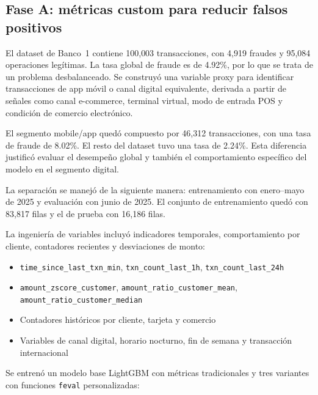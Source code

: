 \documentclass[10pt,a4paper]{article}
\begin{document}
\subsection{Fase A: métricas custom para reducir falsos positivos}

El dataset de Banco~1 contiene 100{,}003 transacciones, con 4{,}919 fraudes y 95{,}084 operaciones
legítimas. La tasa global de fraude es de 4.92\%, por lo que se trata de un problema desbalanceado.
Se construyó una variable proxy para identificar transacciones de app móvil o canal digital
equivalente, derivada a partir de señales como canal e-commerce, terminal virtual, modo de
entrada POS y condición de comercio electrónico.

El segmento mobile/app quedó compuesto por 46{,}312 transacciones, con una tasa de fraude
de 8.02\%. El resto del dataset tuvo una tasa de 2.24\%. Esta diferencia justificó evaluar
el desempeño global y también el comportamiento específico del modelo en el segmento digital.

La separación se manejó de la siguiente manera: entrenamiento con enero--mayo de 2025 y evaluación con
junio de 2025. El conjunto de entrenamiento quedó con 83{,}817 filas y el de prueba con 16{,}186 filas.

La ingeniería de variables incluyó indicadores temporales, comportamiento por cliente,
contadores recientes y desviaciones de monto:

\begin{itemize}[leftmargin=*, itemsep=0pt]
  \item \texttt{time\_since\_last\_txn\_min}, \texttt{txn\_count\_last\_1h},
        \texttt{txn\_count\_last\_24h}
  \item \texttt{amount\_zscore\_customer}, \texttt{amount\_ratio\_customer\_mean},
        \texttt{amount\_ratio\_customer\_median}
  \item Contadores históricos por cliente, tarjeta y comercio
  \item Variables de canal digital, horario nocturno, fin de semana y transacción internacional
\end{itemize}

Se entrenó un modelo base LightGBM con métricas tradicionales y tres variantes con funciones
\texttt{feval} personalizadas:
\end{document}
